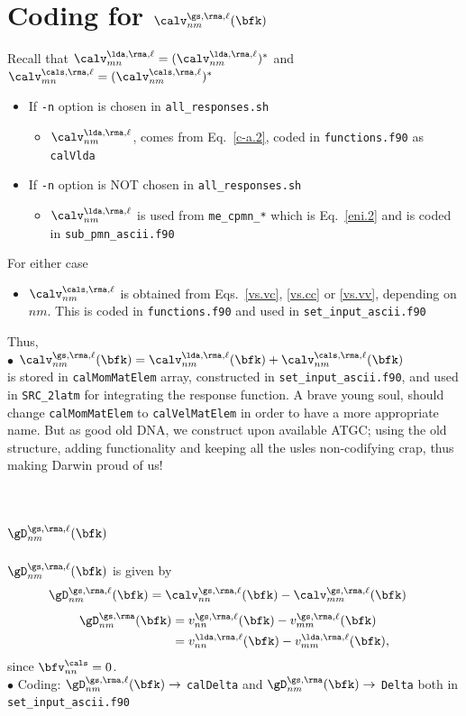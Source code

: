 \section{Coding for $\calv^{\gs,\rma,\ell}_{nm}(\bfk)$} 
Recall that 
$\calv^{\lda,\rma,\ell}_{mn}=(\calv^{\lda,\rma,\ell}_{nm})^*$
and 
$\calv^{\cals,\rma,\ell}_{mn}=(\calv^{\cals,\rma,\ell}_{nm})^*$ 
\begin{itemize}
\item If \verb=-n= option is chosen in \verb=all_responses.sh=
\begin{itemize}
\item $\calv^{\lda,\rma,\ell}_{nm}$, comes from
  Eq.~\eqref{c-a.2}, coded in \verb=functions.f90= as \verb=calVlda=
\end{itemize}
\item If \verb=-n= option is NOT chosen in \verb=all_responses.sh=
\begin{itemize}
\item $\calv^{\lda,\rma,\ell}_{nm}$ 
is used from \verb=me_cpmn_*=
  which is Eq.~\eqref{eni.2} and is coded in \verb=sub_pmn_ascii.f90=
\end{itemize}
\end{itemize}
For either case
\begin{itemize}
\item $\calv^{\cals,\rma,\ell}_{nm}$ 
is obtained from
  Eqs.~\eqref{vs.vc}, \eqref{vs.cc} or \eqref{vs.vv}, depending on
  $nm$. This is coded in \verb=functions.f90= and used in 
\verb=set_input_ascii.f90=  
\end{itemize}
Thus,\\
$\bullet$ 
$\calv^{\gs,\rma,\ell}_{nm}(\bfk)=\calv^{\lda,\rma,\ell}_{nm}(\bfk)+\calv^{\cals,\rma,\ell}_{nm}(\bfk)$\\ 
is stored in \verb=calMomMatElem=  
array, constructed in 
\verb=set_input_ascii.f90=, and used in \verb=SRC_2latm= for
integrating the response function. A brave young soul, should change   
\verb=calMomMatElem= to \verb=calVelMatElem= in order to have a more
appropriate name. But as good old DNA, we construct upon available
ATGC; using the old structure, adding functionality and  keeping all
the usles non-codifying crap, thus making Darwin
 proud of us! 

\section{$\gD^{\gs,\rma,\ell}_{nm}(\bfk)$}
$\gD^{\gs,\rma,\ell}_{nm}(\bfk)$  is given by
\begin{align}\label{caldelta}
\gD^{\gs,\rma,\ell}_{nm}(\bfk)&=\calv^{\gs,\rma,\ell}_{nn}(\bfk)-\calv^{\gs,\rma,\ell}_{mm}(\bfk)
\end{align}
\begin{align}\label{delta}
\gD^{\gs,\rma}_{nm}(\bfk) &=v^{\gs,\rma,\ell}_{nn}(\bfk)-v^{\gs,\rma,\ell}_{mm}(\bfk)
\nonumber\\
&=v^{\lda,\rma,\ell}_{nn}(\bfk)-v^{\lda,\rma,\ell}_{mm}(\bfk)
,
\end{align}
since $\bfv^\cals_{nn}=0$.\\
$\bullet$ Coding: $\gD^{\gs,\rma,\ell}_{nm}(\bfk)\to$ \verb=calDelta= 
and
$\gD^{\gs,\rma}_{nm}(\bfk)\to$ \verb=Delta= both in \verb=set_input_ascii.f90= 

